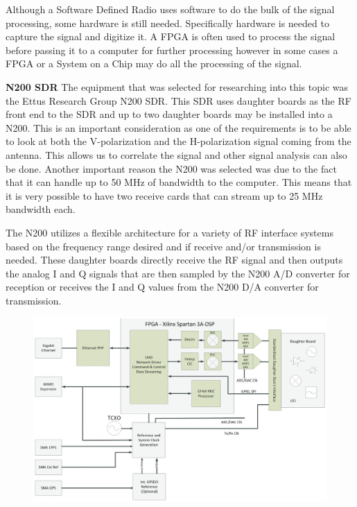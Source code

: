 Although a Software Defined Radio uses software to do the bulk of the signal processing, some hardware is still needed.  Specifically hardware is needed to capture the signal and digitize it.  A FPGA is often used to process the signal before passing it to a computer for further processing however in some cases a FPGA or a System on a Chip may do all the processing of the signal.

\textbf{N200 SDR} The equipment that was selected for researching into this topic was the Ettus Research Group N200 SDR.  This SDR uses daughter boards as the RF front end to the SDR and up to two daughter boards may be installed into a N200.  This is an important consideration as one of the requirements is to be able to look at both the V-polarization and the H-polarization signal coming from the antenna.  This allows us to correlate the signal and other signal analysis can also be done.  Another important reason the N200 was selected was due to the fact that it can handle up to 50 MHz of bandwidth to the computer.  This means that it is very possible to have two receive cards that can stream up to 25 MHz bandwidth each.  

The N200 utilizes a flexible architecture for a variety of RF interface systems based on the frequency range desired and if receive and/or transmission is needed.  These daughter boards directly receive the RF signal and then outputs the analog I and Q signals that are then sampled by the N200 A/D converter for reception or receives the I and Q values from the N200 D/A converter for transmission. 

 {\begin{figure}[h!tb] 
\centering
\includegraphics[width=14cm]{Images/n200_block_edited}
\label{N200_block}
\end{figure}
}

